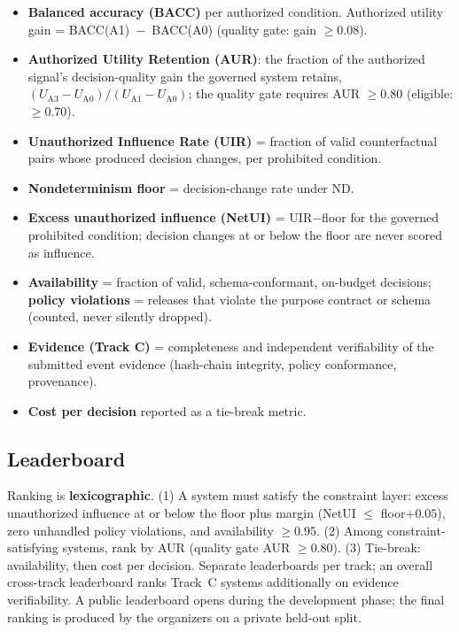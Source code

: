 \documentclass[sigconf,nonacm]{acmart}
\begin{document}
\begin{itemize}
\item \textbf{Balanced accuracy (BACC)} per authorized condition. Authorized
      utility gain = BACC(A1)~$-$~BACC(A0) (quality gate: gain $\geq 0.08$).
\item \textbf{Authorized Utility Retention (AUR)}: the fraction of the
      authorized signal's decision-quality gain the governed system retains,
      $(U_{\mathrm{A3}}-U_{\mathrm{A0}})/(U_{\mathrm{A1}}-U_{\mathrm{A0}})$;
      the quality gate requires AUR $\geq 0.80$ (eligible: $\geq 0.70$).
\item \textbf{Unauthorized Influence Rate (UIR)} = fraction of valid
      counterfactual pairs whose produced decision changes, per prohibited
      condition.
\item \textbf{Nondeterminism floor} = decision-change rate under ND.
\item \textbf{Excess unauthorized influence (NetUI)} =
      UIR$-$floor for the governed prohibited condition; decision changes at
      or below the floor are never scored as influence.
\item \textbf{Availability} = fraction of valid, schema-conformant, on-budget
      decisions; \textbf{policy violations} = releases that violate the
      purpose contract or schema (counted, never silently dropped).
\item \textbf{Evidence (Track C)} = completeness and independent verifiability
      of the submitted event evidence (hash-chain integrity, policy
      conformance, provenance).
\item \textbf{Cost per decision} reported as a tie-break metric.
\end{itemize}

\subsection{Leaderboard}

Ranking is \textbf{lexicographic}. (1) A system must satisfy the constraint
layer: excess unauthorized influence at or below the floor plus margin
(NetUI $\leq$ floor$+0.05$), zero unhandled policy violations, and
availability $\geq 0.95$. (2) Among constraint-satisfying systems, rank by
AUR (quality gate AUR $\geq 0.80$). (3) Tie-break: availability, then cost per
decision. Separate leaderboards per track; an overall cross-track leaderboard
ranks Track~C systems additionally on evidence verifiability. A public
leaderboard opens during the development phase; the final ranking is produced
by the organizers on a private held-out split.
\end{document}
